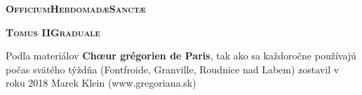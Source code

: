
\def \feria {A}
\def \feriashort {b}
\def \ohschaptername {c}
\let\feriashort\relax
\let\feria\relax
{}
\begin{center}\huge{\textbf{\textsc{Officium\linebreak Hebdomadæ\linebreak Sanctæ}}}\end{center}

\begin{center}\large{\textbf{\textsc{Tomus II\linebreak Graduale}}}\end{center}
\thispagestyle{empty}
\newpage{}

\clearpage
{}
\begin{center}
Podľa materiálov \textbf{Chœur grégorien de Paris}, 
\linebreak tak ako sa každoročne používajú počas svätého týždňa
\linebreak (Fontfroide, Granville, Roudnice nad Labem)
\linebreak zostavil v roku 2018 Marek Klein (www.gregoriana.sk)
\end{center}
\thispagestyle{empty}
\clearpage
\begin{comment}
\end{comment}


